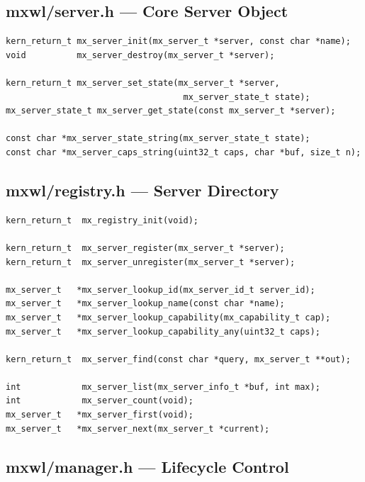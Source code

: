 \documentclass[a4paper,11pt]{article}
\begin{document}
\subsection{mxwl/server.h --- Core Server Object}

\begin{lstlisting}
kern_return_t mx_server_init(mx_server_t *server, const char *name);
void          mx_server_destroy(mx_server_t *server);

kern_return_t mx_server_set_state(mx_server_t *server,
                                   mx_server_state_t state);
mx_server_state_t mx_server_get_state(const mx_server_t *server);

const char *mx_server_state_string(mx_server_state_t state);
const char *mx_server_caps_string(uint32_t caps, char *buf, size_t n);
\end{lstlisting}

\subsection{mxwl/registry.h --- Server Directory}

\begin{lstlisting}
kern_return_t  mx_registry_init(void);

kern_return_t  mx_server_register(mx_server_t *server);
kern_return_t  mx_server_unregister(mx_server_t *server);

mx_server_t   *mx_server_lookup_id(mx_server_id_t server_id);
mx_server_t   *mx_server_lookup_name(const char *name);
mx_server_t   *mx_server_lookup_capability(mx_capability_t cap);
mx_server_t   *mx_server_lookup_capability_any(uint32_t caps);

kern_return_t  mx_server_find(const char *query, mx_server_t **out);

int            mx_server_list(mx_server_info_t *buf, int max);
int            mx_server_count(void);
mx_server_t   *mx_server_first(void);
mx_server_t   *mx_server_next(mx_server_t *current);
\end{lstlisting}

\subsection{mxwl/manager.h --- Lifecycle Control}
\end{document}
